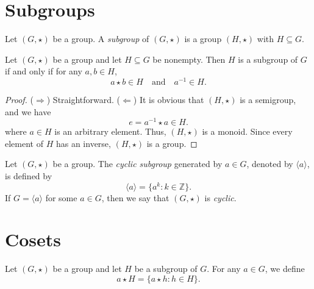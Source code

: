 \section{Subgroups}
\begin{definition}
  Let $(G, \star)$ be a group.
  A \emph{subgroup} of $(G, \star)$ is a group $(H, \star)$ with
  $H \subseteq G$.
\end{definition}

\begin{theorem}
  Let $(G, \star)$ be a group and let $H \subseteq G$ be nonempty.
  Then $H$ is a subgroup of $G$ if and only if for any $a, b \in H$,
  \begin{equation*}
    a \star b \in H
    \quad \text{and} \quad
    a^{-1} \in H.
  \end{equation*}
\end{theorem}
\begin{proof}
  ($\Rightarrow$)
  Straightforward.
  ($\Leftarrow$)
  It is obvious that $(H, \star)$ is a semigroup, and we have
  \begin{equation*}
    e = a^{-1} \star a \in H.
  \end{equation*}
  where $a \in H$ is an arbitrary element.
  Thus, $(H, \star)$ is a monoid.
  Since every element of $H$ has an inverse, $(H, \star)$ is a group.
\end{proof}

\begin{definition}
  Let $(G, \star)$ be a group.
  The \emph{cyclic subgroup} generated by $a \in G$, denoted by
  $\langle a \rangle$, is defined by
  \begin{equation*}
    \langle a \rangle = \{a^k: k \in \mathbb{Z}\}.
  \end{equation*}
  If $G = \langle a \rangle$ for some $a \in G$, then we say that $(G, \star)$
  is \emph{cyclic}.
\end{definition}

\section{Cosets}
\begin{definition}
  Let $(G, \star)$ be a group and let $H$ be a subgroup of $G$.
  For any $a \in G$, we define
  \begin{equation*}
    a \star H = \{a \star h: h \in H\}.
  \end{equation*}
\end{definition}

